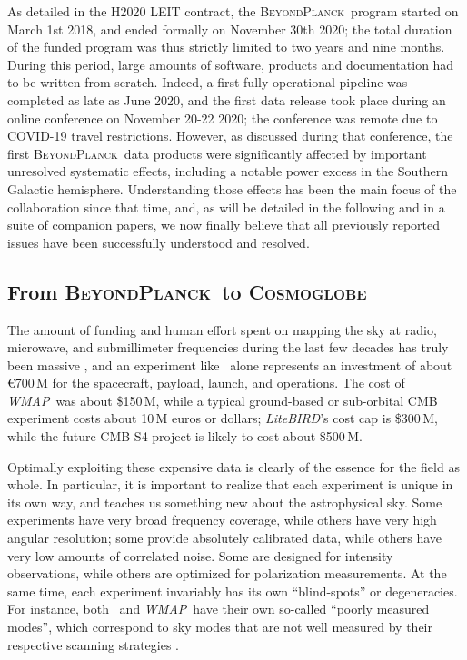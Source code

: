\documentclass[twocolumn]{aa}
\def\WMAP{\emph{WMAP}}
\newcommand{\BP}{\textsc{BeyondPlanck}}
\begin{document}
As detailed in the H2020 LEIT contract, the \BP\ program started on
March 1st 2018, and ended formally on November 30th 2020; the total
duration of the funded program was thus strictly limited to two years
and nine months. During this period, large amounts of software,
products and documentation had to be written from scratch. Indeed, a
first fully operational pipeline was completed as late as June 2020,
and the first data release took place during an online conference on
November 20-22 2020; the conference was remote due to COVID-19 travel
restrictions. However, as discussed during that conference, the first
\BP\ data products were significantly affected by important unresolved
systematic effects, including a notable power excess in the Southern
Galactic hemisphere. Understanding those effects has been the main
focus of the collaboration since that time, and, as will be detailed
in the following and in a suite of companion papers, we now finally
believe that all previously reported issues have been successfully
understood and resolved.

\subsection{From \BP\ to \textsc{Cosmoglobe}}
\label{sec:cosmoglobe}

The amount of funding and human effort spent on mapping the sky at
radio, microwave, and submillimeter frequencies during the last few
decades has truly been massive \citep{bp05}, and an experiment like
\Planck\ alone represents an investment of about \euro 700\,M for the
spacecraft, payload, launch, and operations. The cost of \WMAP\ was
about \$150\,M, while a typical ground-based or sub-orbital CMB
experiment costs about 10\,M euros or dollars; \emph{LiteBIRD}'s cost cap is
\$300\,M, while the future CMB-S4 project is likely to cost about
\$500\,M.

Optimally exploiting these expensive data is clearly of the essence
for the field as whole. In particular, it is important to realize that
each experiment is unique in its own way, and teaches us something new
about the astrophysical sky. Some experiments have very broad
frequency coverage, while others have very high angular resolution;
some provide absolutely calibrated data, while others have very low
amounts of correlated noise. Some are designed for intensity
observations, while others are optimized for polarization
measurements. At the same time, each experiment invariably has its own
``blind-spots'' or degeneracies. For instance, both \Planck\ and
\WMAP\ have their own so-called ``poorly measured modes'', which
correspond to sky modes that are not well measured by their respective
scanning strategies \citep{planck2016-l01,bennett2012,bp17}.
\end{document}
